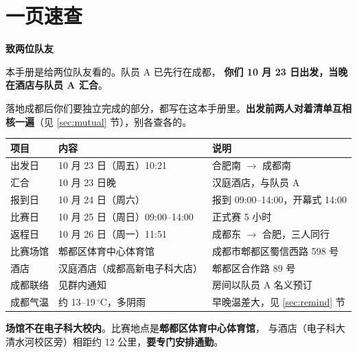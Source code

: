 \documentclass[11pt,a4paper,fontset=windows]{ctexart}
\newcommand{\thd}[1]{\textbf{\color{main}#1}}
\begin{document}
\thispagestyle{empty}
\tableofcontents
\newpage

\section{一页速查}

\begin{keybox}
\textbf{\color{main}致两位队友}

\vspace{0.35em}
本手册是给两位队友看的。队员 A 已先行在成都，
\textbf{你们 10 月 23 日出发，当晚在酒店与队员 A 汇合}。

\vspace{0.35em}
落地成都后你们要独立完成的部分，都写在这本手册里。\textbf{出发前两人对着清单互相核一遍}（见 \ref{sec:mutual} 节），别各查各的。
\end{keybox}

\vspace{0.8em}
\begin{center}
\begin{tabularx}{\textwidth}{@{}L{3.1cm}L{6.0cm}X@{}}
\toprule
\thd{项目} & \thd{内容} & \thd{说明}\\
\midrule
出发日 & 10 月 23 日（周五）10:21 & 合肥南 $\rightarrow$ 成都南\\
汇合 & 10 月 23 日晚 & 汉庭酒店，与队员 A\\
报到日 & 10 月 24 日（周六） & 报到 09:00--14:00，开幕式 14:00\\
比赛日 & 10 月 25 日（周日）09:00--14:00 & 正式赛 5 小时\\
返程日 & 10 月 26 日（周一）11:51 & 成都东 $\rightarrow$ 合肥，三人同行\\
比赛场馆 & 郫都区体育中心体育馆 & 成都市郫都区蜀信西路 598 号\\
酒店 & 汉庭酒店（成都高新电子科大店） & 郫都区合作路 89 号\\
成都联络 & 见群内通知 & 房间以队员 A 名义预订\\
成都气温 & 约 13--19\,$^\circ$C，多阴雨 & 早晚温差大，见 \ref{sec:remind} 节\\
\bottomrule
\end{tabularx}
\end{center}

\begin{warnbox}
\textbf{场馆不在电子科大校内}。比赛地点是\textbf{郫都区体育中心体育馆}，
与酒店（电子科大清水河校区旁）相距约 12 公里，\textbf{要专门安排通勤}。
\end{warnbox}
\end{document}
